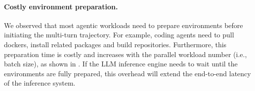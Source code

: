 \paragraph{Costly environment preparation.}
We observed that most agentic workloads need to prepare environments before initiating the multi-turn trajectory. For example, coding agents need to pull dockers, install related packages and build repositories. Furthermore, this preparation time is costly and increases with the parallel workload number (i.e., batch size),  as shown in . If the LLM inference engine needs to wait until the environments are fully prepared, this overhead will extend the end-to-end latency of the inference system.












